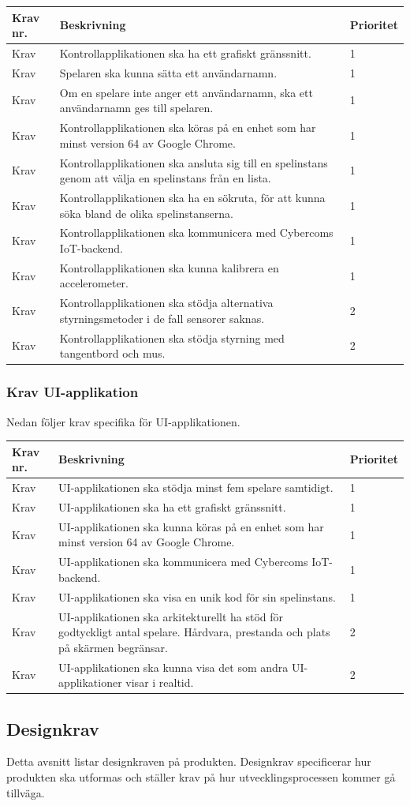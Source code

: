 \documentclass[10pt]{article}
\newcounter{indexcounter}
\newcommand{\Krav}[2]{
	\stepcounter{indexcounter}
	Krav \arabic{indexcounter} & #1 & #2 \\ \hline
}
\begin{document}
	\begin{tabular}{| p{2cm} | p{8cm} | p{2cm}|}
		\hline
		
		\textbf{Krav nr.} & \textbf{Beskrivning} &\textbf{Prioritet} \\ \hline
		\Krav{Kontrollapplikationen ska ha ett grafiskt gränssnitt.}{1}
		\Krav{Spelaren ska kunna sätta ett användarnamn.}{1}
		\Krav{Om en spelare inte anger ett användarnamn, ska ett användarnamn ges till spelaren.}{1}
		\Krav{Kontrollapplikationen ska köras på en enhet som har minst version 64 av Google Chrome.}{1}
		\Krav{Kontrollapplikationen ska ansluta sig till en spelinstans genom att välja en spelinstans från en lista.}{1}
		\Krav{Kontrollapplikationen ska ha en sökruta, för att kunna söka bland de olika spelinstanserna.}{1}
		\Krav{Kontrollapplikationen ska kommunicera med Cybercoms IoT-backend.}{1}
		\Krav{Kontrollapplikationen ska kunna kalibrera en accelerometer.}{1}
		\Krav{Kontrollapplikationen ska stödja alternativa styrningsmetoder i de fall sensorer saknas.}{2}
		\Krav{Kontrollapplikationen ska stödja styrning med tangentbord och mus.}{2}

	\end{tabular}

	\pagebreak
	\subsubsection*{Krav UI-applikation}
	Nedan följer krav specifika för UI-applikationen.\\

	\begin{tabular}{| p{2cm} | p{8cm} | p{2cm}|}
		\hline
		
		\textbf{Krav nr.} & \textbf{Beskrivning} &\textbf{Prioritet} \\ \hline
		\Krav{UI-applikationen ska stödja minst fem spelare samtidigt.}{1}
		\Krav{UI-applikationen ska ha ett grafiskt gränssnitt.}{1}
		\Krav{UI-applikationen ska kunna köras på en enhet som har minst version 64 av Google Chrome.}{1}
		\Krav{UI-applikationen ska kommunicera med Cybercoms IoT-backend.}{1}
		\Krav{UI-applikationen ska visa en unik kod för sin spelinstans.}{1}
		\Krav{UI-applikationen ska arkitekturellt ha stöd för godtyckligt antal spelare. Hårdvara, prestanda och plats på skärmen begränsar.}{2}
		\Krav{UI-applikationen ska kunna visa det som andra UI-applikationer visar i realtid.}{2}
						
	\end{tabular}
	
	\subsection{Designkrav}
	Detta avsnitt listar designkraven på produkten. Designkrav specificerar hur produkten ska utformas och ställer krav på hur utvecklingsprocessen kommer gå tillväga.  \\
	
\end{document}
